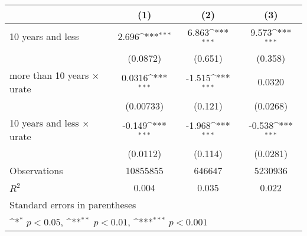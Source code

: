 {
\def\sym#1{\ifmmode^{#1}\else\(^{#1}\)\fi}
\begin{tabular}{l*{3}{c}}
\hline\hline
                                   &\multicolumn{1}{c}{(1)}&\multicolumn{1}{c}{(2)}&\multicolumn{1}{c}{(3)}\\
\hline
10 years and less                  &       2.696\sym{***}&       6.863\sym{***}&       9.573\sym{***}\\
                                   &    (0.0872)         &     (0.651)         &     (0.358)         \\
[1em]
more than 10 years $\times$ urate  &      0.0316\sym{***}&      -1.515\sym{***}&      0.0320         \\
                                   &   (0.00733)         &     (0.121)         &    (0.0268)         \\
[1em]
10 years and less $\times$ urate   &      -0.149\sym{***}&      -1.968\sym{***}&      -0.538\sym{***}\\
                                   &    (0.0112)         &     (0.114)         &    (0.0281)         \\
\hline
Observations                       &    10855855         &      646647         &     5230936         \\
\(R^{2}\)                          &       0.004         &       0.035         &       0.022         \\
\hline\hline
\multicolumn{4}{l}{\footnotesize Standard errors in parentheses}\\
\multicolumn{4}{l}{\footnotesize \sym{*} \(p<0.05\), \sym{**} \(p<0.01\), \sym{***} \(p<0.001\)}\\
\end{tabular}
}
